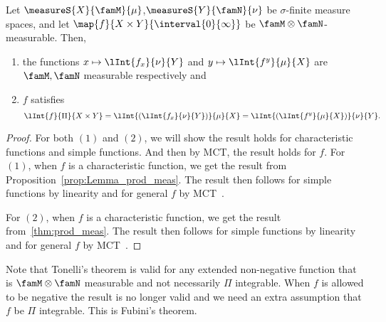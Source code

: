 \begin{Proposition}[name=Tonelli's Theorem]\label{prop:tonelli_thm}
    Let $\measureS{X}{\famM}{\mu}$,$\measureS{Y}{\famN}{\nu}$ be $\sigma$-finite measure spaces, and let
    $\map{f}{X\times Y}{\interval{0}{\infty}}$ be $\famM\otimes\famN$-measurable. Then,
    \begin{enumerate}
	\item
	    the functions $x\mapsto\lInt{f_x}{\nu}{Y}$ and $y\mapsto\lInt{f^{y}}{\mu}{X}$ are $\famM,\famN$
	    measurable respectively and
	\item
	    $f$ satisfies
	    \[\lInt{f}{\Pi}{X\times Y} = \lInt{\left(\lInt{f_x}{\nu}{Y}\right)}{\mu}{X}
	      = \lInt{\left(\lInt{f^{y}}{\mu}{X}\right)}{\nu}{Y}.\]
    \end{enumerate}
    \begin{proof}
	For both $(1)$ and $(2)$, we will show the result holds for characteristic functions and simple
	functions. And then by MCT, the result holds for $f$. For $(1)$, when $f$ is a characteristic
	function, we get the result from Proposition~\ref{prop:Lemma_prod_meas}. The result then follows for
	simple functions by linearity and for general $f$ by MCT~.

	For $(2)$, when $f$ is a characteristic function, we get the result from~\ref{thm:prod_meas}. The
	result then follows for simple functions by linearity and for general $f$ by MCT~.
    \end{proof}
\end{Proposition}
Note that Tonelli's theorem is valid for any extended non-negative function that is $\famM\otimes\famN$
measurable and not necessarily $\Pi$ integrable. When $f$ is allowed to be negative the result is no longer
valid and we need an extra assumption that $f$ be $\Pi$ integrable. This is Fubini's theorem.

